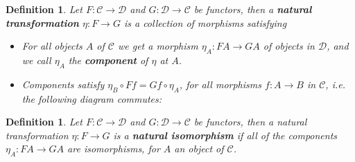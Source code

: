 \documentclass[11pt]{report}
\newcommand{\mcC}{\mathcal{C}}
\newcommand{\mcD}{\mathcal{D}}
\newtheorem{defn}[thm]{Definition} %
\begin{document}
\begin{defn}
  Let $F: \mcC \to \mcD$ and $G: \mcD \to \mcC$ be functors, then a \textbf{natural transformation} $\eta: F \to G$ is a collection of morphisms satisfying
  \begin{itemize}
    \item For all objects $A$ of $\mcC$ we get a morphism $\eta_A: FA \to GA$ of objects in $\mcD$, and we call $\eta_A$ the \textbf{component }of $\eta$ at $A$. \\
    \item Components satisfy $\eta_B \circ Ff = Gf \circ \eta_A$, for all morphisms $f: A \to B$ in $\mcC$,
      i.e. the following diagram commutes:
      \begin{center}
      \end{center}

  \end{itemize}
\end{defn}

\begin{defn}
Let $F: \mcC \to \mcD$ and $G: \mcD \to \mcC$ be functors, then a natural transformation $\eta: F \to G$ is a \textbf{natural isomorphism} if all of the components $\eta_A:FA \to GA$ are isomorphisms, for $A$ an object of $\mcC$.
\end{defn}
\end{document}
